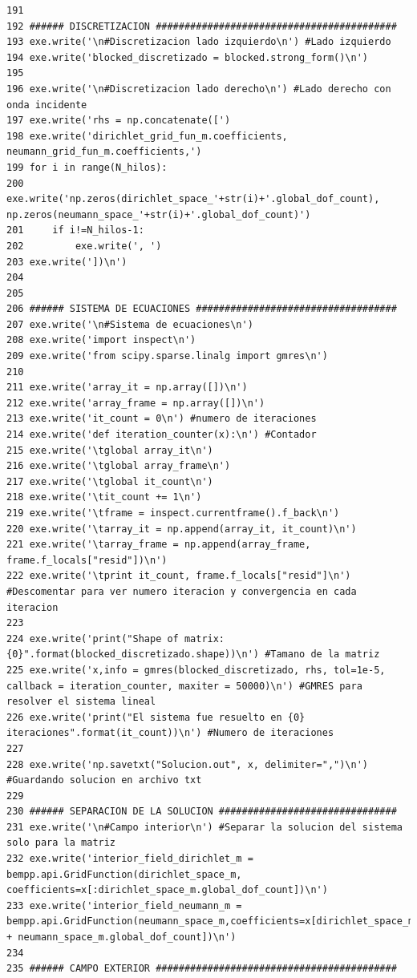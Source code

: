 \documentclass[12pt,letterpaper]{article}
\numberwithin{equation}{section}
\begin{document}
\begin{lstlisting}
191 
192 ###### DISCRETIZACION ##########################################
193 exe.write('\n#Discretizacion lado izquierdo\n') #Lado izquierdo
194 exe.write('blocked_discretizado = blocked.strong_form()\n')
195 
196 exe.write('\n#Discretizacion lado derecho\n') #Lado derecho con onda incidente
197 exe.write('rhs = np.concatenate([')
198 exe.write('dirichlet_grid_fun_m.coefficients, neumann_grid_fun_m.coefficients,')
199 for i in range(N_hilos):
200     exe.write('np.zeros(dirichlet_space_'+str(i)+'.global_dof_count), np.zeros(neumann_space_'+str(i)+'.global_dof_count)')
201     if i!=N_hilos-1:
202         exe.write(', ')
203 exe.write('])\n')
204 
205 
206 ###### SISTEMA DE ECUACIONES ###################################
207 exe.write('\n#Sistema de ecuaciones\n')
208 exe.write('import inspect\n')
209 exe.write('from scipy.sparse.linalg import gmres\n')
210 
211 exe.write('array_it = np.array([])\n')
212 exe.write('array_frame = np.array([])\n')
213 exe.write('it_count = 0\n') #numero de iteraciones
214 exe.write('def iteration_counter(x):\n') #Contador
215 exe.write('\tglobal array_it\n')
216 exe.write('\tglobal array_frame\n')
217 exe.write('\tglobal it_count\n')
218 exe.write('\tit_count += 1\n')
219 exe.write('\tframe = inspect.currentframe().f_back\n')
220 exe.write('\tarray_it = np.append(array_it, it_count)\n')
221 exe.write('\tarray_frame = np.append(array_frame, frame.f_locals["resid"])\n')
222 exe.write('\tprint it_count, frame.f_locals["resid"]\n') #Descomentar para ver numero iteracion y convergencia en cada iteracion
223 
224 exe.write('print("Shape of matrix: {0}".format(blocked_discretizado.shape))\n') #Tamano de la matriz
225 exe.write('x,info = gmres(blocked_discretizado, rhs, tol=1e-5, callback = iteration_counter, maxiter = 50000)\n') #GMRES para resolver el sistema lineal
226 exe.write('print("El sistema fue resuelto en {0} iteraciones".format(it_count))\n') #Numero de iteraciones
227 
228 exe.write('np.savetxt("Solucion.out", x, delimiter=",")\n') #Guardando solucion en archivo txt
229 
230 ###### SEPARACION DE LA SOLUCION ###############################
231 exe.write('\n#Campo interior\n') #Separar la solucion del sistema solo para la matriz
232 exe.write('interior_field_dirichlet_m = bempp.api.GridFunction(dirichlet_space_m, coefficients=x[:dirichlet_space_m.global_dof_count])\n')
233 exe.write('interior_field_neumann_m = bempp.api.GridFunction(neumann_space_m,coefficients=x[dirichlet_space_m.global_dof_count:dirichlet_space_m.global_dof_count + neumann_space_m.global_dof_count])\n')
234 
235 ###### CAMPO EXTERIOR ##########################################

\end{lstlisting}
\end{document}
